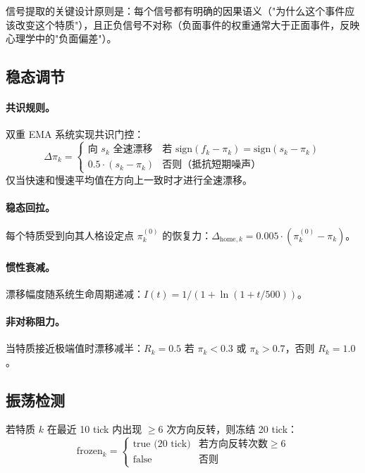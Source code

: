 \documentclass[11pt]{article}
\begin{document}
信号提取的关键设计原则是：每个信号都有明确的因果语义（"为什么这个事件应该改变这个特质"），且正负信号不对称（负面事件的权重通常大于正面事件，反映心理学中的"负面偏差"）。

\subsection{稳态调节}

\paragraph{共识规则。}双重 EMA 系统实现共识门控：
\begin{equation}
\Delta\pi_k = \begin{cases}
\text{向 } s_k \text{ 全速漂移} & \text{若 } \text{sign}(f_k - \pi_k) = \text{sign}(s_k - \pi_k) \\
0.5 \cdot (s_k - \pi_k) & \text{否则（抵抗短期噪声）}
\end{cases}
\end{equation}
仅当快速和慢速平均值在方向上一致时才进行全速漂移。

\paragraph{稳态回拉。}每个特质受到向其人格设定点 $\pi_k^{(0)}$ 的恢复力：$\Delta_{\text{home},k} = 0.005 \cdot (\pi_k^{(0)} - \pi_k)$。

\paragraph{惯性衰减。}漂移幅度随系统生命周期递减：$I(t) = 1 / (1 + \ln(1 + t/500))$。

\paragraph{非对称阻力。}当特质接近极端值时漂移减半：$R_k = 0.5$ 若 $\pi_k < 0.3$ 或 $\pi_k > 0.7$，否则 $R_k = 1.0$。

\subsection{振荡检测}

若特质 $k$ 在最近 10 tick 内出现 $\geq 6$ 次方向反转，则冻结 20 tick：
\begin{equation}
\text{frozen}_k = \begin{cases} \text{true (20 tick)} & \text{若方向反转次数} \geq 6 \\ \text{false} & \text{否则} \end{cases}
\end{equation}
\end{document}
